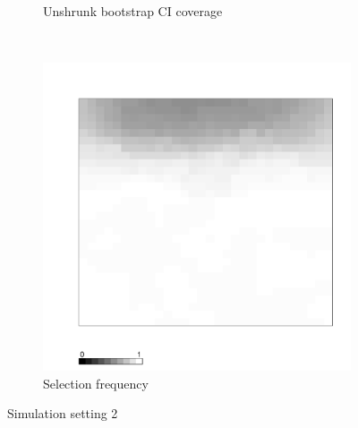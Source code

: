 \documentclass[authoryear, review, 11pt]{elsarticle}
\begin{document}
\begin{figure}
\begin{subfigure}[b]{0.45\textwidth}
		\caption{Unshrunk bootstrap CI coverage}
	\end{subfigure}%
	~ %
	\begin{subfigure}[b]{0.45\textwidth}
	\centering
		\includegraphics[width=\textwidth]{../../figures/simulation/X1.15.2.selection.pdf}
		\caption{Selection frequency}
	\end{subfigure}
	\caption{Simulation setting 2}
\end{figure}

\clearpage
\end{document}

